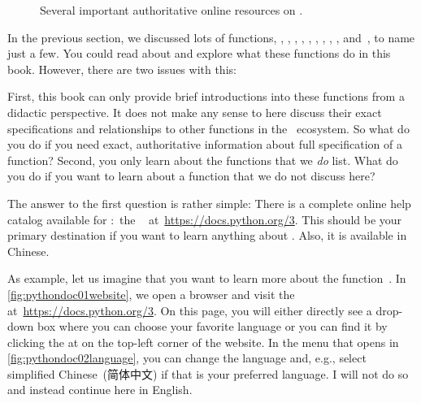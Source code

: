 \begin{figure}%
\centering%
%
%
%
\floatSep%
%
%
%
\floatRowSep%
%
%
%
\floatSep%
%
%
%
\caption{Several important authoritative online resources on \python.}%
\label{fig:pythondoc:C}%
\end{figure}%
%
In the previous section, we discussed lots of functions, , , , , , , , , , and~, to name just a few.
You could read about and explore what these functions do in this book.
However, there are two issues with this:

First, this book can only provide brief introductions into these functions from a didactic perspective.
It does not make any sense to here discuss their exact specifications and relationships to other functions in the \python\ ecosystem.
So what do you do if you need exact, authoritative information about full specification of a function?
Second, you only learn about the functions that we \emph{do} list.
What do you do if you want to learn about a function that we do not discuss here?

The answer to the first question is rather simple:
There is a complete online help catalog available for \python:~the ~\cite{PSF:P3D} at~\url{https://docs.python.org/3}.
This should be your primary destination if you want to learn anything about \python.
Also, it is available in Chinese.

As example, let us imagine that you want to learn more about the function~.
In \cref{fig:pythondoc01website}, we open a browser and visit the ~\cite{PSF:P3D} at~\url{https://docs.python.org/3}.
On this page, you will either directly see a drop-down box where you can choose your favorite language or you can find it by clicking the \menu{\threeBarButton} at on the top-left corner of the website.
In the menu that opens in \cref{fig:pythondoc02language}, you can change the language and, e.g., select simplified Chinese~(简体中文) if that is your preferred language.
I will not do so and instead continue here in English.

